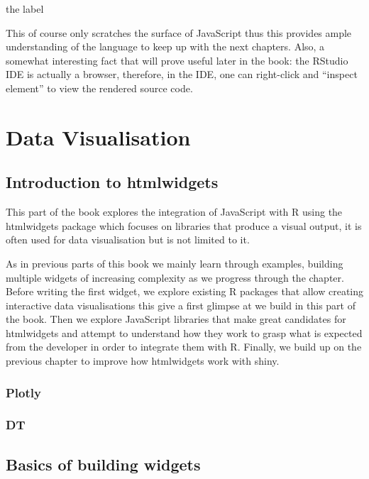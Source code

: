 \documentclass[
]{krantz}
\begin{document}
the label

This of course only scratches the surface of JavaScript thus this provides ample understanding of the language to keep up with the next chapters. Also, a somewhat interesting fact that will prove useful later in the book: the RStudio IDE is actually a browser, therefore, in the IDE, one can right-click and ``inspect element'' to view the rendered source code.

\hypertarget{part-data-visualisation}{%
\part{Data Visualisation}\label{part-data-visualisation}}

\hypertarget{introduction-to-htmlwidgets}{%
\chapter{Introduction to htmlwidgets}\label{introduction-to-htmlwidgets}}

This part of the book explores the integration of JavaScript with R using the htmlwidgets package which focuses on libraries that produce a visual output, it is often used for data visualisation but is not limited to it.

As in previous parts of this book we mainly learn through examples, building multiple widgets of increasing complexity as we progress through the chapter. Before writing the first widget, we explore existing R packages that allow creating interactive data visualisations this give a first glimpse at we build in this part of the book. Then we explore JavaScript libraries that make great candidates for htmlwidgets and attempt to understand how they work to grasp what is expected from the developer in order to integrate them with R. Finally, we build up on the previous chapter to improve how htmlwidgets work with shiny.

\hypertarget{plotly}{%
\section{Plotly}\label{plotly}}

\hypertarget{dt}{%
\section{DT}\label{dt}}

\hypertarget{basics-of-building-widgets}{%
\chapter{Basics of building widgets}\label{basics-of-building-widgets}}
\end{document}
